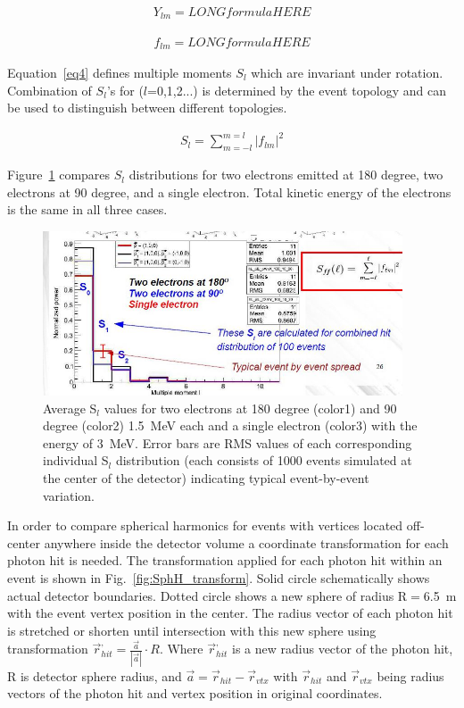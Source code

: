 \documentclass[12pt,twoside,letterpaper]{article}
\begin{document}
\begin{eqnarray}
\label{eq2}
Y_{lm} = LONGformulaHERE
\end{eqnarray}

\begin{eqnarray}
\label{eq3}
f_{lm} = LONGformulaHERE
\end{eqnarray}

Equation~\ref{eq4} defines multiple moments $S_l$ which are invariant under rotation. Combination of $S_l$'s for ($l$=0,1,2...) is determined by the event topology and can be used to distinguish between different topologies.

\begin{eqnarray}
\label{eq4}
S_l = \sum_{m=-l}^{m=l} |f_{lm}|^2
\end{eqnarray}

Figure~\ref{fig:Moments} compares $S_l$ distributions for two electrons emitted at 180 degree, two electrons at 90 degree, and a single electron. Total kinetic energy of the electrons is the same in all three cases.


\begin{figure}[htb]
\centering
\includegraphics[angle=0,width=0.95\textwidth]{plots/Multiple_moment.JPG}
\caption{Average S$_l$ values for two electrons at 180 degree (color1) and 90 degree (color2) 1.5~MeV each and a single electron (color3) with the energy of 3~MeV. Error bars are RMS values of each corresponding individual S$_l$ distribution (each consists of 1000 events simulated at the center of the detector) indicating typical event-by-event variation.}
\label{fig:Moments}
\end{figure}


In order to compare spherical harmonics for events with vertices located off-center anywhere inside the detector volume a coordinate transformation for each photon hit is needed. The transformation applied for each photon hit within an event is shown in Fig.~\ref{fig:SphH_transform}. Solid circle schematically shows actual detector boundaries. Dotted circle shows a new sphere of radius R$=$6.5~m with the event vertex position in the center. The radius vector of each photon hit is stretched or shorten until intersection with this new sphere using transformation $\vec{r}^{,}_{hit} = \frac{\vec{a}}{|\vec{a}|} \cdot R$. Where $\vec{r}^{,}_{hit}$ is a new radius vector of the photon hit, R is detector sphere radius, and $\vec{a}=\vec{r}_{hit} - \vec{r}_{vtx}$ with $\vec{r}_{hit}$ and $\vec{r}_{vtx}$ being radius vectors of the photon hit and vertex position in original coordinates.
\end{document}
